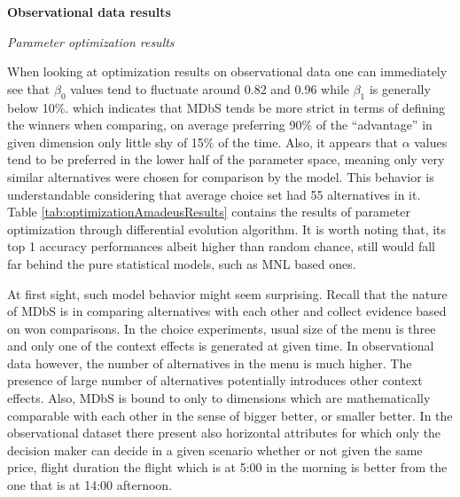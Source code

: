 \documentclass[a4paper,12pt]{article}
\begin{document}
\textbf{Observational data results}

\textit{Parameter optimization results}

When looking at optimization results on observational data one can immediately see that $\beta_0$ values tend to fluctuate around 0.82 and 0.96 while $\beta_1$ is generally below 10\%.  which indicates that MDbS tends be more strict in terms of defining the winners when comparing, on average preferring 90\% of the ``advantage'' in given dimension only little shy of 15\% of the time. Also, it appears that $\alpha$ values tend to be preferred in the lower half of the parameter space, meaning only very similar alternatives were chosen for comparison by the model. This behavior is understandable considering that average choice set had 55 alternatives in it. Table \ref{tab:optimizationAmadeusResults} contains the results of parameter optimization through differential evolution algorithm. It is worth noting that, its top 1 accuracy performances albeit higher than random chance, still would fall far behind the pure statistical models, such as MNL based ones. 

At first sight, such model behavior might seem surprising. Recall that the nature of MDbS is in comparing alternatives with each other and collect evidence based on won comparisons. In the choice experiments, usual size of the menu is three and only one of the context effects is generated at given time. In observational data however, the number of alternatives in the menu is much higher. The presence of large number of alternatives potentially introduces other context effects. Also, MDbS is bound to only to dimensions which are mathematically comparable with each other in the sense of bigger better, or smaller better. In the observational dataset there present also horizontal attributes for which only the decision maker can decide in a given scenario whether or not given the same price, flight duration the flight which is at 5:00 in the morning is better from the one that is at 14:00 afternoon.
\end{document}

